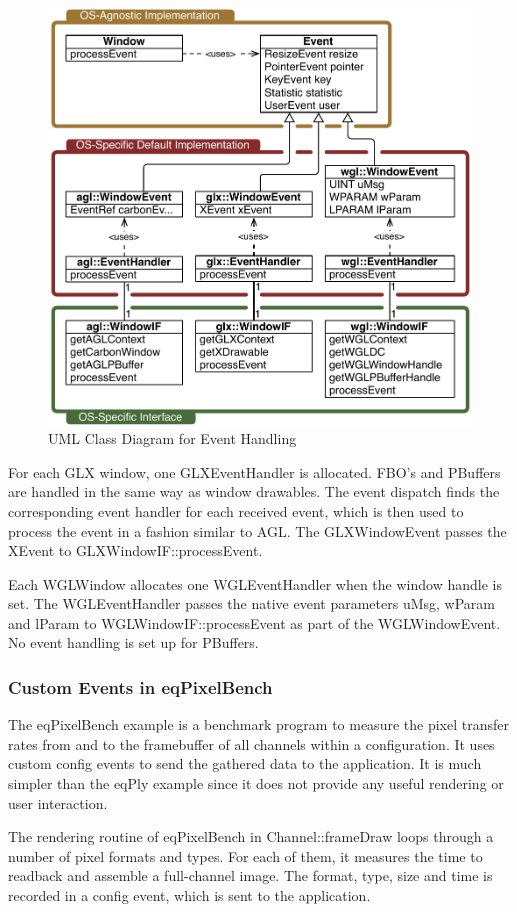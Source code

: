 \documentclass[10pt,a4]{scrartcl}
\begin{document}
\begin{figure}
  \includegraphics[width=.618\textwidth]{images/eventUML.pdf}
  {\caption{\label{fEventUML}UML Class Diagram for Event Handling}}
\end{figure}
For each GLX window, one \textsf{GLXEventHandler} is allocated. FBO's and
PBuffers are handled in the same way as window drawables. The event dispatch
finds the corresponding event handler for each received event, which is then
used to process the event in a fashion similar to AGL. The
\textsf{GLXWindowEvent} passes the \textsf{XEvent} to
\textsf{GLXWindowIF::\-process\-Event}.

Each \textsf{WGLWindow} allocates one \textsf{WGLEventHandler} when the
window handle is set. The WGLEventHandler passes the native event
parameters \textsf{uMsg}, \textsf{wParam} and \textsf{lParam} to
\textsf{WGL\-Win\-dowIF::processEvent} as part of the
\textsf{WGLWindowEvent}. No event handling is set up for PBuffers.

\subsubsection{Custom Events in eqPixelBench}

The \textsf{eqPixelBench} example is a benchmark program to measure the
pixel transfer rates from and to the framebuffer of all channels within
a configuration. It uses custom config events to send the gathered data
to the application. It is much simpler than the \textsf{eqPly} example
since it does not provide any useful rendering or user interaction.

The rendering routine of \textsf{eqPixelBench} in
\textsf{Channel::frameDraw} loops through a number of pixel formats and
types. For each of them, it measures the time to readback and assemble a
full-channel image. The format, type, size and time is recorded in a
config event, which is sent to the application.
\end{document}

